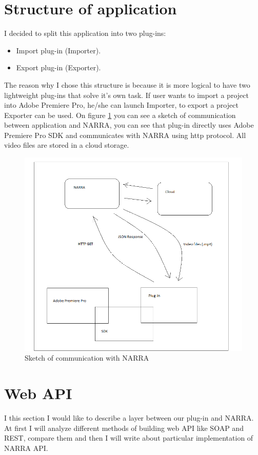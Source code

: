 \documentclass[thesis=B,english]{FITthesis}[2012/10/20]
\begin{document}
\section{Structure of application}
I decided to split this application into two plug-ins:
	\begin{itemize}
		\item Import plug-in (Importer).
		\item Export plug-in (Exporter).
	\end{itemize}
The reason why I chose this structure is because it is more logical to have two lightweight plug-ins that solve it's own task. If user wants to import a project into Adobe Premiere Pro, he/she can launch Importer, to export a project Exporter can be used. On figure \ref{fig:narrastruct} you can see a sketch of communication between application and NARRA, you can see that plug-in directly uses Adobe Premiere Pro SDK and communicates with NARRA using http protocol. All video files are stored in a cloud storage.
	\begin{figure}
		\centering
		\includegraphics[width=1\textwidth]{StructureofNARRA.png}
		\caption{Sketch of communication with NARRA}\label{fig:narrastruct}
	\end{figure}

\section{Web API}
I this section I would like to describe a layer between our plug-in and NARRA. At first I will analyze different methods of building web API like SOAP and REST, compare them and then I will write about particular implementation of NARRA API.
\end{document}

